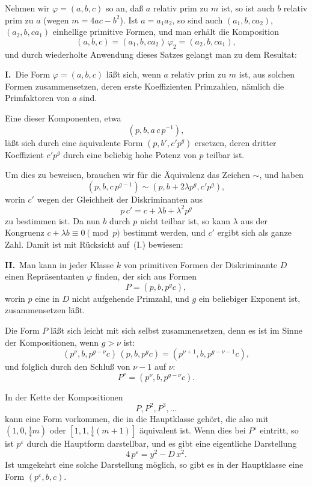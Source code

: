 \documentclass[12pt,a4paper]{article}
\theoremstyle{weber}
\begin{document}
Nehmen wir $\varphi = (a, b, c)$ so an, daß $a$ relativ prim zu $m$ ist, so ist auch $b$ relativ prim zu $a$ (wegen $m = 4ac - b^2$). Ist $a = a_1 a_2$, so sind auch $(a_1, b, c a_2)$, $(a_2, b, c a_1)$ einhellige primitive Formen, und man erhält die Komposition
\[
(a, b, c) = (a_1, b, c a_2)\,\varphi_2 = (a_2, b, c a_1),
\]
und durch wiederholte Anwendung dieses Satzes gelangt man zu dem Resultat:

\medskip
\textbf{I.}\ Die Form $\varphi = (a, b, c)$ läßt sich, wenn $a$ relativ prim zu $m$ ist, aus solchen Formen zusammensetzen, deren erste Koeffizienten Primzahlen, nämlich die Primfaktoren von $a$ sind.

\medskip
Eine dieser Komponenten, etwa
\[
(p, b, a\,c\,p^{-1}),
\]
läßt sich durch eine äquivalente Form $(p, b', c' p^g)$ ersetzen, deren dritter Koeffizient $c' p^g$ durch eine beliebig hohe Potenz von $p$ teilbar ist.

Um dies zu beweisen, brauchen wir für die Äquivalenz das Zeichen $\sim$, und haben
\[
(p, b, c\,p^{g-1}) \sim (p, b + 2\lambda p^g, c' p^g),
\]
worin $c'$ wegen der Gleichheit der Diskriminanten aus
\[
p\,c' = c + \lambda b + \lambda^2 p^g
\]
zu bestimmen ist. Da nun $b$ durch $p$ nicht teilbar ist, so kann $\lambda$ aus der Kongruenz $c + \lambda b \equiv 0 \pmod{p}$ bestimmt werden, und $c'$ ergibt sich als ganze Zahl. Damit ist mit Rücksicht auf~(I.) bewiesen:

\medskip
\textbf{II.}\ Man kann in jeder Klasse $k$ von primitiven Formen der Diskriminante $D$ einen Repräsentanten $\varphi$ finden, der sich aus Formen
\[
P = (p, b, p^g c),
\]
worin $p$ eine in $D$ nicht aufgehende Primzahl, und $g$ ein beliebiger Exponent ist, zusammensetzen läßt.

\medskip
Die Form $P$ läßt sich leicht mit sich selbst zusammensetzen, denn es ist im Sinne der Kompositionen, wenn $g > \nu$ ist:
\[
(p^\nu, b, p^{g-\nu} c)\,(p, b, p^g c) = (p^{\nu+1}, b, p^{g-\nu-1} c),
\]
und folglich durch den Schluß von $\nu - 1$ auf $\nu$:
\begin{equation}
P^\nu = (p^\nu, b, p^{g-\nu} c).
\end{equation}

In der Kette der Kompositionen
\begin{equation}
P, P^2, P^3, \ldots
\end{equation}
kann eine Form vorkommen, die in die Hauptklasse gehört, die also mit $(1, 0, \frac{1}{4}m)$ oder $[1, 1, \frac{1}{4}(m+1)]$ äquivalent ist. Wenn dies bei $P^\varepsilon$ eintritt, so ist $p^\varepsilon$ durch die Hauptform darstellbar, und es gibt eine eigentliche Darstellung
\begin{equation}
4\,p^\varepsilon = y^2 - D\,x^2.
\end{equation}
Ist umgekehrt eine solche Darstellung möglich, so gibt es in der Hauptklasse eine Form $(p^\varepsilon, b, c)$.
\end{document}
